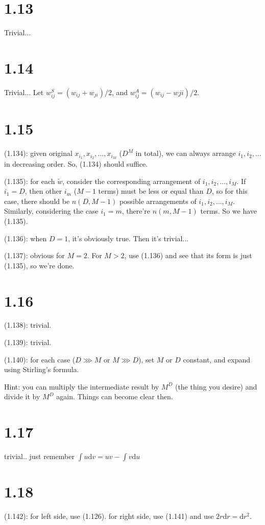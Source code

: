 \documentclass[12pt]{article}
\begin{document}
\section{1.13}
Trivial...

\section{1.14}
Trivial... Let $w^S_{ij} = (w_{ij} + w_{ji})/2$, and $w^A_{ij} = (w_{ij}-w{ji})/2$.

\section{1.15}
(1.134): given original $x_{i_1}, x_{i_2}, \ldots, x_{i_M}$ ($D^M$ in total), we can always arrange $i_1, i_2, \ldots$ in decreasing order. So, (1.134) should suffice.

(1.135): for each $\widetilde{w}$, consider the corresponding arrangement of ${i_1}, {i_2}, \ldots, {i_M}$. If ${i_1} = D$, then other $i_{m}$ ($M-1$ terms) must be less or equal than $D$, so for this case, there should be $n(D,M-1)$ possible arrangements of ${i_1}, {i_2}, \ldots, {i_M}$. Similarly, considering the case $i_1 = m$, there're $n(m,M-1)$ terms. So we have (1.135).

(1.136): when $D=1$, it's obviously true. Then it's trivial...

(1.137): obvious for $M=2$. For $M>2$, use (1.136) and see that its form is just (1.135), so we're done.

\section{1.16}
(1.138): trivial.

(1.139): trivial.

(1.140): for each case ($D \ggg M$ or $M \ggg D$), set $M$ or $D$ constant, and expand using Stirling's formula.

Hint: you can multiply the intermediate result by $M^D$ (the thing you desire) and divide it by $M^D$ again. Things can become clear then.

\section{1.17}
trivial.. just remember $\int u \mathrm{d}v = uv - \int v  \mathrm{d}u$


\section{1.18}
(1.142): for left side, use (1.126). for right side, use (1.141) and use $2r\mathrm{d}r = \mathrm{d}r^2$.
\end{document}
